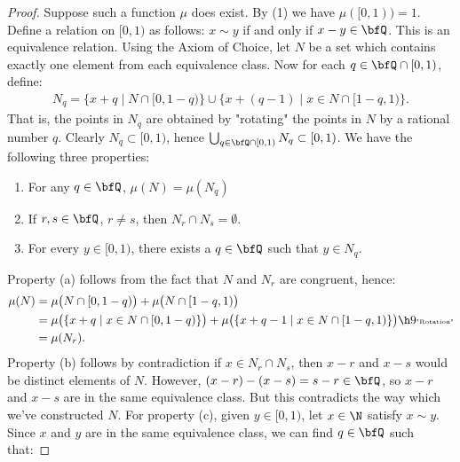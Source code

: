         \begin{proof}
            Suppose such a function $\mu$ does exist. By (1) we have $\mu([0,1)) = 1$. Define a relation on $[0,1)$ as follows: $x \sim y$ if and only if $x-y \in \bfQ$. This is an equivalence relation. Using the Axiom of Choice, let $N$ be a set which contains exactly one element from each equivalence class. Now for each $q \in \bfQ \cap [0,1)$, define:
                \begin{equation*}
                \begin{split}
                    N_q = \{x + q \mid N \cap [0,1-q)\} \cup \{x + (q-1) \mid x \in N \cap [1-q,1)\}.
                \end{split}
                \end{equation*}
            That is, the points in $N_q$ are obtained by "rotating" the points in $N$ by a rational number $q$. Clearly $N_q \subset [0,1)$, hence $\bigcup_{q \in \bfQ \cap [0,1)}N_q \subset [0,1)$. 
            We have the following three properties:
                \begin{enumerate}[label = (\alph*),itemsep=1pt,topsep=3pt]
                    \item For any $q \in \bfQ$, $\mu(N) = \mu(N_q)$
                    \item If $r,s \in \bfQ$, $r \neq s$, then $N_r \cap N_s = \emptyset$.
                    \item For every $y \in [0,1)$, there exists a $q \in \bfQ$ such that $y \in N_q$.
                \end{enumerate}
            Property (a) follows from the fact that $N$ and $N_r$ are congruent, hence:
                \begin{equation*}
                \begin{split}
                    \mu(N) 
                    & = \mu \bigl( N \cap [0,1-q) \bigr) + \mu\bigl(N \cap [1-q,1)\bigr) \\
                    & = \mu\bigl( \{x + q \mid x \in N \cap [0,1-q)\}\bigr) + \mu \bigl( \{x + q - 1 \mid x\in N \cap [1-q,1)\}\bigr) \h9\text{\tiny "Rotation"} \\
                    & = \mu(N_r).
                \end{split}
                \end{equation*}
            Property (b) follows by contradiction \textemdash if $x \in N_r \cap N_s$, then $x - r$ and $x - s$ would be distinct elements of $N$. However, $(x-r) - (x-s) = s-r \in \bfQ$, so $x-r$ and $x-s$ are in the same equivalence class. But this contradicts the way which we've constructed $N$. For property (c), given $y \in [0,1)$, let $x \in \N$ satisfy $x \sim y$. Since $x$ and $y$ are in the same equivalence class, we can find $q \in \bfQ$ such that:

\end{proof}
